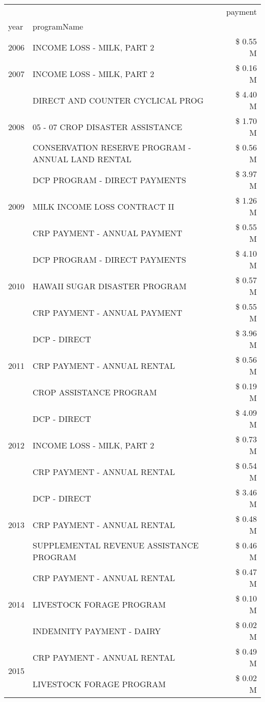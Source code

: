 \begin{tabular}{llr}
\toprule
 &  & payment \\
year & programName &  \\
\midrule
2006 & INCOME LOSS - MILK, PART 2 & \$ 0.55 M \\
\cline{1-3}
2007 & INCOME LOSS - MILK, PART 2 & \$ 0.16 M \\
\cline{1-3}
\multirow[t]{3}{*}{2008} & DIRECT AND COUNTER CYCLICAL PROG & \$ 4.40 M \\
 & 05 - 07 CROP DISASTER ASSISTANCE & \$ 1.70 M \\
 & CONSERVATION RESERVE PROGRAM - ANNUAL LAND RENTAL & \$ 0.56 M \\
\cline{1-3}
\multirow[t]{3}{*}{2009} & DCP PROGRAM - DIRECT PAYMENTS & \$ 3.97 M \\
 & MILK INCOME LOSS CONTRACT II & \$ 1.26 M \\
 & CRP PAYMENT - ANNUAL PAYMENT & \$ 0.55 M \\
\cline{1-3}
\multirow[t]{3}{*}{2010} & DCP PROGRAM - DIRECT PAYMENTS & \$ 4.10 M \\
 & HAWAII SUGAR DISASTER PROGRAM & \$ 0.57 M \\
 & CRP PAYMENT - ANNUAL PAYMENT & \$ 0.55 M \\
\cline{1-3}
\multirow[t]{3}{*}{2011} & DCP - DIRECT & \$ 3.96 M \\
 & CRP PAYMENT - ANNUAL RENTAL & \$ 0.56 M \\
 & CROP ASSISTANCE PROGRAM & \$ 0.19 M \\
\cline{1-3}
\multirow[t]{3}{*}{2012} & DCP - DIRECT & \$ 4.09 M \\
 & INCOME LOSS - MILK, PART 2 & \$ 0.73 M \\
 & CRP PAYMENT - ANNUAL RENTAL & \$ 0.54 M \\
\cline{1-3}
\multirow[t]{3}{*}{2013} & DCP - DIRECT & \$ 3.46 M \\
 & CRP PAYMENT - ANNUAL RENTAL & \$ 0.48 M \\
 & SUPPLEMENTAL REVENUE ASSISTANCE PROGRAM & \$ 0.46 M \\
\cline{1-3}
\multirow[t]{3}{*}{2014} & CRP PAYMENT - ANNUAL RENTAL & \$ 0.47 M \\
 & LIVESTOCK FORAGE PROGRAM & \$ 0.10 M \\
 & INDEMNITY PAYMENT - DAIRY & \$ 0.02 M \\
\cline{1-3}
\multirow[t]{3}{*}{2015} & CRP PAYMENT - ANNUAL RENTAL & \$ 0.49 M \\
 & LIVESTOCK FORAGE PROGRAM & \$ 0.02 M \\

\end{tabular}
